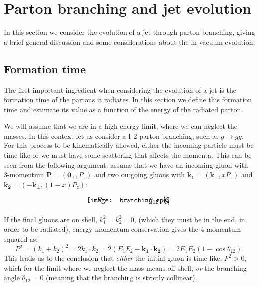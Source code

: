 \documentclass[a4paper,12pt]{article}
\numberwithin{equation}{section}
\begin{document}
\section{Parton branching and jet evolution}\label{general}

In this section we consider the evolution of a jet through parton branching, giving a brief general discussion and some considerations about the in vacuum evolution.

\subsection{Formation time}


The first important ingredient when considering the evolution of a jet is the formation time of the partons it radiates. In this section we define this formation time and estimate its value as a function of the energy of the radiated parton. 

We will assume that we are in a high energy limit, where we can neglect the masses. In this context let us consider a  1-2 parton branching, such as $g\rightarrow gg$.
For this process to be kinematically allowed, either the incoming particle must be time-like or we must have some scattering that affects the momenta. This can be seen from the following argument: assume that we have an incoming gluon with 3-momentum $\mathbf{P}=(\mathbf{0_\perp},P_z)$ and two outgoing gluons with $\mathbf{k_1}=(\mathbf{k_\perp},xP_z)$ and $\mathbf{k_2}=(-\mathbf{k_\perp},(1-x)P_z)$:
\begin{equation}
\begin{gathered}
\begin{tikzpicture}
    \node[anchor=south west,inner sep=0] (image) at (0,0) {\texttt{[image: branching.eps]}};
    \begin{scope}[x={(image.south east)},y={(image.north west)}]
        \draw[] (0.70,0.35) arc (-20:20:0.5);
        \node[] at (0.15, 0.65) {$P$};
        \node[] at (0.95, 0.25) {$k_1$};
		\node[] at (0.95, 0.75) {$k_2$};
        \node[] at (0.8, 0.5) {$\theta_{12}$};
    \end{scope}
\end{tikzpicture}
\end{gathered}
\end{equation}
If the final gluons are on shell, $k_1^2=k_2^2=0$, (which they must be in the end, in order to be radiated), energy-momentum conservation gives the 4-momentum squared as:
\begin{equation}
P^2=(k_1+k_2)^2=2 k_1 \cdot k_2=2(E_1E_2-\mathbf{k_1}\cdot\mathbf{k_2})=2E_1E_2(1-\cos\theta_{12}).
\end{equation}
This leads us to the conclusion that \emph{either} the initial gluon is time-like, $P^2>0$, which for the limit where we neglect the mass means off shell, \emph{or} the branching angle $\theta_{12}=0$ (meaning that the branching is strictly collinear).
\end{document}
